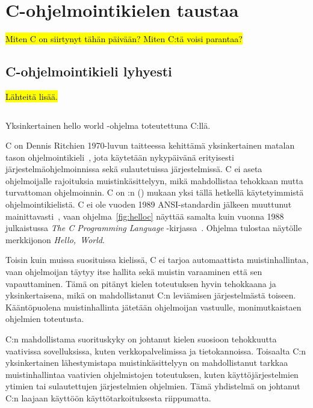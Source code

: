 \section{C-ohjelmointikielen taustaa}

\hl{Miten C on siirtynyt tähän päivään? Miten C:tä voisi parantaa?}

\subsection{C-ohjelmointikieli lyhyesti}

\hl{Lähteitä lisää.}

\begin{listing}[ht!]
    \inputminted{C}{koodi/hello.c}
    \caption{Yksinkertainen hello world -ohjelma toteutettuna C:llä.}
    \label{fig:helloc}
\end{listing}

C on Dennis Ritchien 1970-luvun taitteessa kehittämä yksinkertainen matalan
tason ohjelmointikieli~\citep{chistory}, jota käytetään nykypäivänä erityisesti
järjestelmäohjelmoinnissa sekä sulautetuissa järjestelmissä. C ei aseta
ohjelmoijalle rajoituksia muistinkäsittelyyn, mikä mahdollistaa tehokkaan mutta
turvattoman ohjelmoinnin. C on \citeauthor{tiobe}:n (\citeyear{tiobe}) mukaan
yksi tällä hetkellä käytetyimmistä ohjelmointikielistä. C ei ole vuoden 1989
ANSI-standardin jälkeen muuttunut mainittavasti~\citep{chistory, C18}, vaan
ohjelma~\ref{fig:helloc} näyttää samalta kuin vuonna 1988 julkaistussa
\emph{The C Programming Language} -kirjassa~\citep{krsecond}. Ohjelma tulostaa
näytölle merkkijonon \emph{Hello,~World}.

Toisin kuin muissa suosituissa kielissä, C ei tarjoa automaattista
muistinhallintaa, vaan ohjelmoijan täytyy itse hallita sekä muistin varaaminen
että sen vapauttaminen. Tämä on pitänyt kielen toteutuksen hyvin tehokkaana ja
yksinkertaisena, mikä on mahdollistanut C:n leviämisen järjestelmästä toiseen.
Kääntöpuolena muistinhallinta jätetään ohjelmoijan vastuulle, monimutkaistaen
ohjelmien toteutusta.

C:n mahdollistama suorituskyky on johtanut kielen suosioon tehokkuutta
vaativissa sovelluksissa, kuten verkkopalvelimissa ja tietokannoissa.
Toisaalta C:n yksinkertainen lähestymistapa muistinkäsittelyyn on
mahdollistanut tarkkaa muistinhallintaa vaativien ohjelmistojen toteutuksen,
kuten käyttöjärjestelmien ytimien tai sulautettujen järjestelmien ohjelmien.
Tämä yhdistelmä on johtanut C:n laajaan käyttöön käyttötarkoituksesta
riippumatta.

